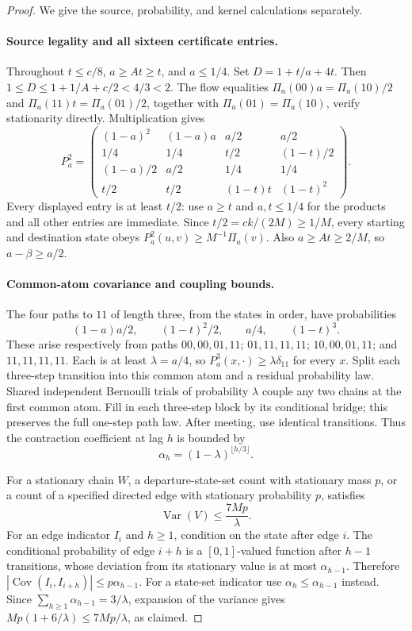 \begin{proof}
We give the source, probability, and kernel calculations separately.

\paragraph{Source legality and all sixteen certificate entries.}
Throughout $t\le c/8$, $a\ge At\ge t$, and $a\le1/4$. Set
$D=1+t/a+4t$. Then
$1\le D\le1+1/A+c/2<4/3<2$.
The flow equalities
$\Pi_a(00)a=\Pi_a(10)/2$ and
$\Pi_a(11)t=\Pi_a(01)/2$, together with
$\Pi_a(01)=\Pi_a(10)$, verify stationarity directly. Multiplication gives
\begin{equation}
 P_a^2=\begin{pmatrix}
 (1-a)^2&(1-a)a&a/2&a/2\\
 1/4&1/4&t/2&(1-t)/2\\
 (1-a)/2&a/2&1/4&1/4\\
 t/2&t/2&(1-t)t&(1-t)^2
 \end{pmatrix}.
 \label{eq:all-sixteen}
\end{equation}
Every displayed entry is at least $t/2$: use $a\ge t$ and
$a,t\le1/4$ for the products and all other entries are immediate.
Since $t/2=ck/(2M)\ge1/M$, every starting and destination state obeys
$P_a^2(u,v)\ge M^{-1}\Pi_a(v)$. Also $a\ge At\ge2/M$, so
$a-\beta\ge a/2$.

\paragraph{Common-atom covariance and coupling bounds.}
The four paths to $11$ of length three, from the states in order, have
probabilities
\[
 (1-a)a/2,\qquad (1-t)^2/2,\qquad a/4,\qquad(1-t)^3.
\]
These arise respectively from paths $00,00,01,11$;
$01,11,11,11$; $10,00,01,11$; and $11,11,11,11$.
Each is at least $\lambda=a/4$, so
$P_a^3(x,\cdot)\ge\lambda\delta_{11}$ for every $x$.
Split each three-step transition into this common atom and a residual
probability law. Shared independent Bernoulli trials of probability
$\lambda$ couple any two chains at the first common atom. Fill in each
three-step block by its conditional bridge; this preserves the full
one-step path law. After meeting, use identical transitions. Thus the
contraction coefficient at lag $h$ is bounded by
\[
 \alpha_h=(1-\lambda)^{\lfloor h/3\rfloor}.
\]

For a stationary chain $W$, a departure-state-set count with stationary
mass $p$, or a count of a specified directed edge with stationary
probability $p$, satisfies
\begin{equation}
 \operatorname{Var}(V)\le\frac{7Mp}{\lambda}.
 \label{eq:common-atom-variance}
\end{equation}
For an edge indicator $I_i$ and $h\ge1$, condition on the state after
edge $i$. The conditional probability of edge $i+h$ is a $[0,1]$-valued
function after $h-1$ transitions, whose deviation from its stationary
value is at most $\alpha_{h-1}$. Therefore
$|\operatorname{Cov}(I_i,I_{i+h})|\le p\alpha_{h-1}$.
For a state-set indicator use $\alpha_h\le\alpha_{h-1}$ instead.
Since $\sum_{h\ge1}\alpha_{h-1}=3/\lambda$, expansion of the variance
gives $Mp(1+6/\lambda)\le7Mp/\lambda$, as claimed.


\end{proof}
